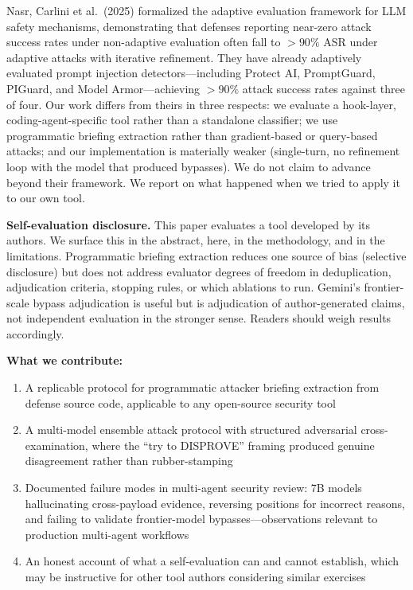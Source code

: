 \documentclass[11pt]{article}
\begin{document}
Nasr, Carlini et al.\ (2025) formalized the adaptive evaluation framework for LLM safety mechanisms, demonstrating that defenses reporting near-zero attack success rates under non-adaptive evaluation often fall to \(>90\%\) ASR under adaptive attacks with iterative refinement. They have already adaptively evaluated prompt injection detectors---including Protect AI, PromptGuard, PIGuard, and Model Armor---achieving \(>90\%\) attack success rates against three of four. Our work differs from theirs in three respects: we evaluate a hook-layer, coding-agent-specific tool rather than a standalone classifier; we use programmatic briefing extraction rather than gradient-based or query-based attacks; and our implementation is materially weaker (single-turn, no refinement loop with the model that produced bypasses). We do not claim to advance beyond their framework. We report on what happened when we tried to apply it to our own tool.

\medskip
\noindent\textbf{Self-evaluation disclosure.} This paper evaluates a tool developed by its authors. We surface this in the abstract, here, in the methodology, and in the limitations. Programmatic briefing extraction reduces one source of bias (selective disclosure) but does not address evaluator degrees of freedom in deduplication, adjudication criteria, stopping rules, or which ablations to run. Gemini's frontier-scale bypass adjudication is useful but is adjudication of author-generated claims, not independent evaluation in the stronger sense. Readers should weigh results accordingly.

\medskip
\noindent\textbf{What we contribute:}
\begin{enumerate}
  \item A replicable protocol for programmatic attacker briefing extraction from defense source code, applicable to any open-source security tool
  \item A multi-model ensemble attack protocol with structured adversarial cross-examination, where the ``try to DISPROVE'' framing produced genuine disagreement rather than rubber-stamping
  \item Documented failure modes in multi-agent security review: 7B models hallucinating cross-payload evidence, reversing positions for incorrect reasons, and failing to validate frontier-model bypasses---observations relevant to production multi-agent workflows
  \item An honest account of what a self-evaluation can and cannot establish, which may be instructive for other tool authors considering similar exercises
\end{enumerate}
\end{document}
